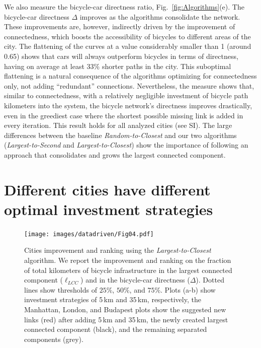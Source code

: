 We also measure the bicycle-car directness ratio, Fig.~\ref{fig:Algorithms}(e). The bicycle-car directness $\Delta$ improves as the algorithms consolidate the network. These improvements are, however, indirectly driven by the improvement of connectedness, which boosts the accessibility of bicycles to different areas of the city. The flattening of the curves at a value considerably smaller than 1 (around 0.65) shows that cars will always outperform bicycles in terms of directness, having on average at least 33\% shorter paths in the city. This suboptimal flattening is a natural consequence of the algorithms optimizing for connectedness only, not adding ``redundant'' connections. Nevertheless, the measure shows that, similar to connectedness, with a relatively negligible investment of bicycle path kilometers into the system, the bicycle network's directness improves drastically, even in the greediest case where the shortest possible missing link is added in every iteration. This result holds for all analyzed cities (see SI). The large differences between the baseline \emph{Random-to-Closest} and our two algorithms (\emph{Largest-to-Second} and \emph{Largest-to-Closest}) show the importance of following an approach that consolidates and grows the largest connected component.

\section{Different cities have different optimal investment strategies}

\begin{figure}[htbp!]
  \centering
  \texttt{[image: images/datadriven/Fig04.pdf]}
  \caption[Cities bicycle connectivity improvement]{Cities improvement and ranking using the \emph{Largest-to-Closest} algorithm. We report the improvement and ranking on the fraction of total kilometers of bicycle infrastructure in the largest connected component ($\ell_{LCC}$) and in the bicycle-car directness ($\Delta$). Dotted lines show thresholds of $25\%$, $50\%$, and $75\%$. Plots (a-b) show investment strategies of 5\,km and 35\,km, respectively, the Manhattan, London, and Budapest plots show the suggested new links (red) after adding 5\,km and 35\,km, the newly created largest connected component (black), and the remaining separated components (grey).}
  \label{fig:Improvement}
\end{figure}

